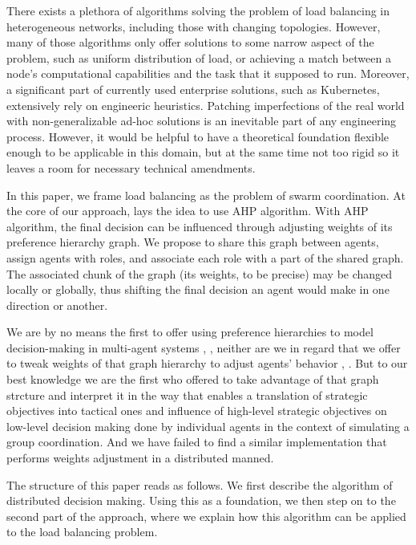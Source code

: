 
There exists a plethora of algorithms solving the problem of load balancing in heterogeneous networks, including those with changing topologies.
However, many of those algorithms only offer solutions to some narrow aspect of the problem, such as uniform distribution of load, or achieving a match between a node's computational capabilities and the task that it supposed to run.
Moreover, a significant part of currently used enterprise solutions, such as Kubernetes, extensively rely on engineeric heuristics.
Patching imperfections of the real world with non-generalizable ad-hoc solutions is an inevitable part of any engineering process.
However, it would be helpful to have a theoretical foundation flexible enough to be applicable in this domain, but at the same time not too rigid so it leaves a room for necessary technical amendments.

In this paper, we frame load balancing as the problem of swarm coordination.
At the core of our approach, lays the idea to use AHP algorithm.
With AHP algorithm, the final decision can be influenced through adjusting weights of its preference hierarchy graph.
We propose to share this graph between agents, assign agents with roles, and associate each role with a part of the shared graph.
The associated chunk of the graph (its weights, to be precise) may be changed locally or globally, thus shifting the final decision an agent would make in one direction or another.


We are by no means the first to offer using preference hierarchies to model decision-making in multi-agent systems \cite{cartvehishvili-2018-model}, \cite{drakaki-2018-intelligent}, neither are we in regard that we offer to tweak weights of that graph hierarchy to adjust agents' behavior \cite{zytniewski-2016-application}, \cite{brintrup-2010-behaviour}.
But to our best knowledge we are the first who offered to take advantage of that graph strcture and interpret it in the way that enables a translation of strategic objectives into tactical ones and influence of high-level strategic objectives on low-level decision making done by individual agents in the context of simulating a group coordination.
And we have failed to find a similar implementation that performs weights adjustment in a distributed manned.

The structure of this paper reads as follows. We first describe the algorithm of distributed decision making.
Using this as a foundation, we then step on to the second part of the approach, where we explain how this algorithm can be applied to the load balancing problem.
